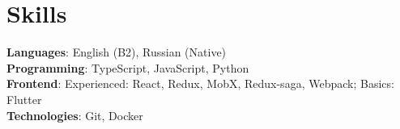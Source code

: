 \documentclass[A4,11pt]{article}
\begin{document}
\section{Skills}
 \begin{itemize}[leftmargin=0.5cm, label={}]
    \small{\item{
     \textbf{Languages}{: English (B2), Russian (Native) } \\
     \textbf{Programming}{: TypeScript, JavaScript, Python } \\
     \textbf{Frontend}{: Experienced: React, Redux, MobX, Redux-saga, Webpack; Basics: Flutter } \\
     \textbf{Technologies}{: Git, Docker } \\
    }}
 \end{itemize}
    
\end{document}
